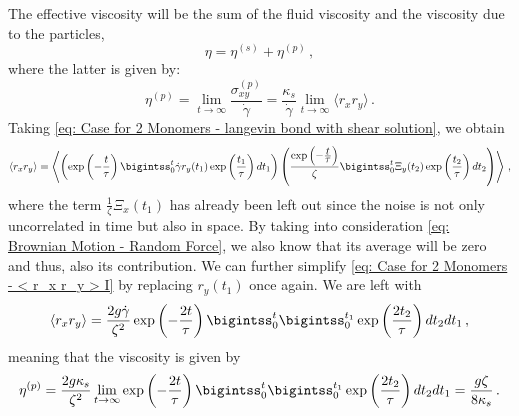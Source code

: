 \documentclass[../../main.tex]{subfiles}
\begin{document}
    The effective viscosity will be the sum of the fluid viscosity and the viscosity due to the particles,
        \begin{equation}
            \eta = \eta^{(s)} + \eta^{(p)} \,,
        \end{equation}
    where the latter is given by:
        \begin{equation}\label{eq: Case for 2 Monomers - viscosity due to particles I}
            \eta^{(p)} = \lim_{t \rightarrow \infty} \frac{\sigma^{(p)}_{xy}}{\Dot{\gamma}} = \frac{\kappa_s}{\Dot{\gamma}} \lim_{t \rightarrow \infty} \langle r_x r_y \rangle \,.
        \end{equation}
    Taking \cref{eq: Case for 2 Monomers - langevin bond with shear solution}, we obtain
        \begin{equation}\label{eq: Case for 2 Monomers - < r_x r_y > I}
            \langle r_x r_y \rangle = \left\langle \left( \exp\left( -\frac{t}{\tau} \right) \bigintss_0^t \Dot{\gamma} r_y(t_1) \exp\left( \frac{t_1}{\tau} \right) dt_1 \right)  
            \left( \frac{\exp\left( -\ddfrac{t}{\tau} \right)}{\zeta} \bigintss_0^t \Xi_y(t_2) \exp\left(\frac{t_2}{\tau} \right)dt_2 \right) \right\rangle \,,
        \end{equation}
    where the term $\frac{1}{\zeta}\Xi_x(t_1)$ has already been left out since the noise is not only uncorrelated in time but also in space. By taking into consideration \cref{eq: Brownian Motion - Random Force}, we also know that its average will be zero and thus, also its contribution. We can further simplify \cref{eq: Case for 2 Monomers - < r_x r_y > I} by replacing $r_y(t_1)$ once again. We are left with
        \begin{equation}\label{eq: Case for 2 Monomers - < r_x r_y > II}
            \langle r_x r_y \rangle = \frac{2g\Dot{\gamma}}{\zeta^2}  \exp\left( -\frac{2t}{\tau} \right) \bigintss_0^t\bigintss_0^{t_1} \exp\left( \frac{2t_2}{\tau} \right) dt_2dt_1 \,,
        \end{equation}
    meaning that the viscosity is given by
        \begin{equation}\label{eq: Case for 2 Monomers - viscosity due to particles II}
                \eta^{(p)} = \frac{2g\kappa_s}{\zeta^2} \lim_{t \rightarrow \infty} \exp\left( -\frac{2t}{\tau} \right) \bigintss_0^t\bigintss_0^{t_1} \exp\left( \frac{2t_2}{\tau} \right) dt_2dt_1 = \frac{g\zeta}{8\kappa_s} \,.
        \end{equation}
    
\end{document}
